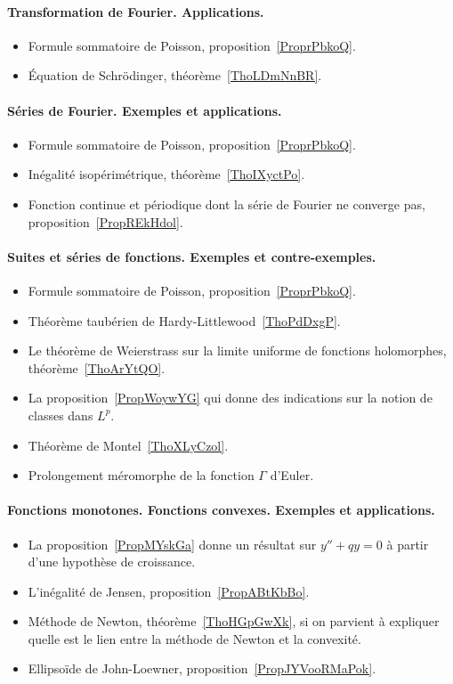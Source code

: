 \paragraph{Transformation de Fourier. Applications.}
\begin{itemize}
	\item Formule sommatoire de Poisson, proposition~\ref{ProprPbkoQ}.
	\item Équation de Schrödinger, théorème~\ref{ThoLDmNnBR}.
\end{itemize}

\paragraph{Séries de Fourier. Exemples et applications.}
\begin{itemize}
	\item Formule sommatoire de Poisson, proposition~\ref{ProprPbkoQ}.
	\item Inégalité isopérimétrique, théorème~\ref{ThoIXyctPo}.
	\item Fonction continue et périodique dont la série de Fourier ne converge pas, proposition~\ref{PropREkHdol}.
\end{itemize}

\paragraph{Suites et séries de fonctions. Exemples et contre-exemples.}
\begin{itemize}
	\item Formule sommatoire de Poisson, proposition~\ref{ProprPbkoQ}.
	\item Théorème taubérien de Hardy-Littlewood~\ref{ThoPdDxgP}.
	\item Le théorème de Weierstrass sur la limite uniforme de fonctions holomorphes, théorème~\ref{ThoArYtQO}.
	\item La proposition~\ref{PropWoywYG} qui donne des indications sur la notion de classes dans \( L^p\).
	\item Théorème de Montel~\ref{ThoXLyCzol}.
	\item Prolongement méromorphe de la fonction \( \Gamma\) d'Euler.
\end{itemize}

\paragraph{Fonctions monotones. Fonctions convexes. Exemples et applications.}
\begin{itemize}
	\item La proposition~\ref{PropMYskGa} donne un résultat sur \( y''+qy=0\) à partir d'une hypothèse de croissance.
	\item L'inégalité de Jensen, proposition~\ref{PropABtKbBo}.
	\item Méthode de Newton, théorème~\ref{ThoHGpGwXk}, si on parvient à expliquer quelle est le lien entre la méthode de Newton et la convexité.
	\item Ellipsoïde de John-Loewner, proposition~\ref{PropJYVooRMaPok}.
\end{itemize}

